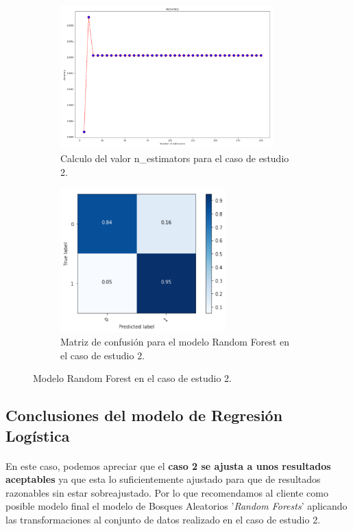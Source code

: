 \begin{figure}[!htb]
    \begin{subfigure}[b]{0.45\linewidth}
    	\centering
	    \includegraphics[width=0.9\textwidth]{images/resultados_rf_ent_conjunto2.png}
    	\caption{Calculo del valor n\_estimators para el caso de estudio 2.}
		\label{rfTrainCase2}
	\end{subfigure}
	\begin{subfigure}[b]{0.45\linewidth} 
		\centering
		\includegraphics[width=0.7\textwidth]{images/resultados_rf_cm_conjunto2.png}
		\caption{Matriz de confusión para el modelo Random Forest en el caso de estudio 2.}
		\label{rfCMCase2}
	\end{subfigure}
	\caption{Modelo Random Forest en el caso de estudio 2.}
	\label{rfCase2}
\end{figure}

\subsection{Conclusiones del modelo de Regresión Logística}
\label{resultados:rf_conclusiones}

\paragraph{}
En este caso, podemos apreciar que el \textbf{caso 2 se ajusta a unos resultados aceptables} ya que esta lo suficientemente ajustado para que de resultados razonables sin estar sobreajustado\cite{ref:knn_overfiting}. Por lo que recomendamos al cliente como posible modelo final el modelo de Bosques Aleatorios '\textit{Random Forests}' aplicando las transformaciones al conjunto de datos realizado en el caso de estudio 2.
